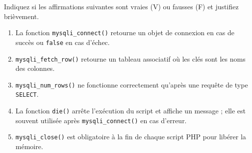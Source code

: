 \documentclass[11pt]{article}
\begin{document}
\begin{exercice}
Indiquez si les affirmations suivantes sont vraies (V) ou fausses (F) et justifiez brièvement.
\begin{enumerate}
    \item La fonction \texttt{mysqli\_connect()} retourne un objet de connexion en cas de succès ou \texttt{false} en cas d'échec.
    \item \texttt{mysqli\_fetch\_row()} retourne un tableau associatif où les clés sont les noms des colonnes.
    \item \texttt{mysqli\_num\_rows()} ne fonctionne correctement qu'après une requête de type \texttt{SELECT}.
    \item La fonction \texttt{die()} arrête l'exécution du script et affiche un message ; elle est souvent utilisée après \texttt{mysqli\_connect()} en cas d'erreur.
    \item \texttt{mysqli\_close()} est obligatoire à la fin de chaque script PHP pour libérer la mémoire.
\end{enumerate}
\end{exercice}
\end{document}
